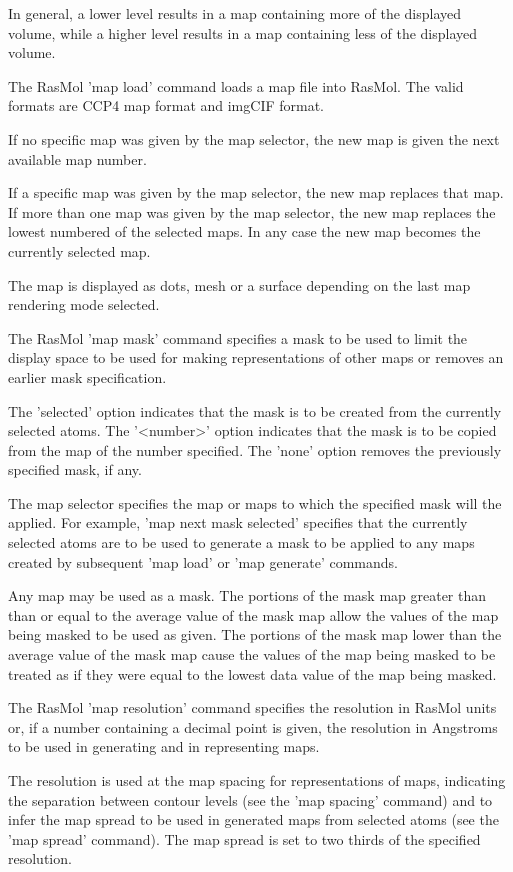 In general, a lower level results in a map containing more of the
displayed volume, while a higher level results in a map containing
less of the displayed volume.

The RasMol
'map load'
command loads a map file into RasMol.  The valid formats are
CCP4 map format and imgCIF format.

If no specific map was given by the map selector, the new map is
given the next available map number.

If a specific map was given by the map selector, the new map replaces
that map.  If more than one map was given by the map selector, the
new map replaces the lowest numbered of the selected maps.  In any
case the new map becomes the currently selected map.

The map is displayed as dots, mesh or a surface depending on the
last map rendering mode selected.

The RasMol
'map mask'
command specifies a mask to be used to limit the display space
to be used for making representations of other maps or removes
an earlier mask specification.

The 'selected' option indicates that the mask is to be created
from the currently selected atoms.  The '<number>' option indicates
that the mask is to be copied from the map of the number specified.
The 'none' option removes the previously specified mask, if any.

The map selector specifies the map or maps to which the specified mask
will the applied.  For example, 'map next mask selected' specifies
that the currently selected atoms are to be used to generate a
mask to be applied to any maps created by subsequent 'map load'
or 'map generate' commands.

Any map may be used as a mask.  The portions of the mask map greater than
than or equal to the average value of the mask map allow the values of the
map being masked to be used as given.  The portions of the mask
map lower than the average value of the mask map cause the values of
the map being masked to be treated as if they were equal to the
lowest data value of the map being masked.

The RasMol
'map resolution'
command specifies the resolution in RasMol units or,
if a number containing a decimal point is given, the
resolution in Angstroms to be used in generating and
in representing maps.

The resolution is used at the map spacing for
representations of maps, indicating the separation
between contour levels (see the
'map spacing'
command) and to infer the map spread to be used in
generated maps from selected atoms (see the
'map spread'
command).  The map spread is set to two thirds of
the specified resolution.

